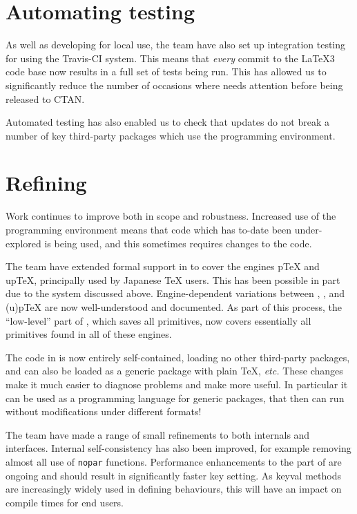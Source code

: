 \documentclass{ltnews}
\begin{document}
\section{Automating  testing}

As well as developing  for local use, the team have also set up
integration testing for  using the Travis-CI system. This means that
\emph{every} commit to the \LaTeX3 code base now results in a full set of tests
being run. This has allowed us to significantly reduce the number of occasions
where  needs attention before being released to CTAN.

Automated testing has also enabled us to check that  updates do not
break a number of key third-party packages which use the programming
environment.

\section{Refining }

Work continues to improve  both in scope and robustness. Increased
use of the programming environment means that code which has to-date been
under-explored is being used, and this sometimes requires changes to the code.

The team have extended formal support in  to cover the engines
p\TeX{} and up\TeX{}, principally used by Japanese \TeX{} users. This has been
possible in part due to the  system discussed above.
Engine-dependent variations between , ,
 and (u)p\TeX{} are now well-understood and documented. As part
of this process, the \enquote{low-level} part of , which saves all
primitives, now covers essentially all primitives found in all of these
engines.

The code in  is now entirely self-contained, loading no other
third-party packages, and can also be loaded as a generic package with plain
\TeX{}, \emph{etc.} These changes make it much easier to diagnose problems and
make  more useful. In particular it can be used as a programming
language for generic packages, that then can run without modifications under
different formats!

The team have made a range of small refinements to both internals and
 interfaces. Internal self-consistency has also been improved, for
example removing almost all use of \texttt{nopar} functions. Performance
enhancements to the  part of  are ongoing and should
result in significantly faster key setting. As keyval methods are increasingly
widely used in defining behaviours, this will have an impact on compile times
for end users.
\end{document}
